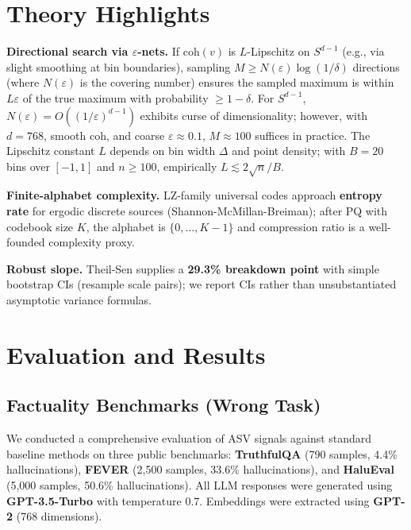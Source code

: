 \documentclass[10pt]{article}
\begin{document}
\section{Theory Highlights}
\label{sec:theory}

\textbf{Directional search via $\varepsilon$-nets.} If $\mathrm{coh}(v)$ is $L$-Lipschitz on $S^{d-1}$ (e.g., via slight smoothing at bin boundaries), sampling $M \ge N(\varepsilon)\log(1/\delta)$ directions (where $N(\varepsilon)$ is the covering number) ensures the sampled maximum is within $L\varepsilon$ of the true maximum with probability $\ge 1-\delta$. For $S^{d-1}$, $N(\varepsilon)=O((1/\varepsilon)^{d-1})$ exhibits curse of dimensionality; however, with $d=768$, smooth $\mathrm{coh}$, and coarse $\varepsilon\approx 0.1$, $M\approx 100$ suffices in practice. The Lipschitz constant $L$ depends on bin width $\Delta$ and point density; with $B=20$ bins over $[-1,1]$ and $n\ge 100$, empirically $L\lesssim 2\sqrt{n}/B$.

\textbf{Finite-alphabet complexity.} LZ-family universal codes approach \textbf{entropy rate} for ergodic discrete sources (Shannon-McMillan-Breiman); after PQ with codebook size $K$, the alphabet is $\{0,\dots,K-1\}$ and compression ratio is a well-founded complexity proxy.

\textbf{Robust slope.} Theil-Sen supplies a \textbf{29.3\% breakdown point} with simple bootstrap CIs (resample scale pairs); we report CIs rather than unsubstantiated asymptotic variance formulas.

\section{Evaluation and Results}
\label{sec:evaluation}

\subsection{Factuality Benchmarks (Wrong Task)}
\label{sec:eval-factuality}

We conducted a comprehensive evaluation of ASV signals against standard baseline methods on three public benchmarks: \textbf{TruthfulQA} (790 samples, 4.4\% hallucinations), \textbf{FEVER} (2,500 samples, 33.6\% hallucinations), and \textbf{HaluEval} (5,000 samples, 50.6\% hallucinations). All LLM responses were generated using \textbf{GPT-3.5-Turbo} with temperature 0.7. Embeddings were extracted using \textbf{GPT-2} (768 dimensions).
\end{document}
